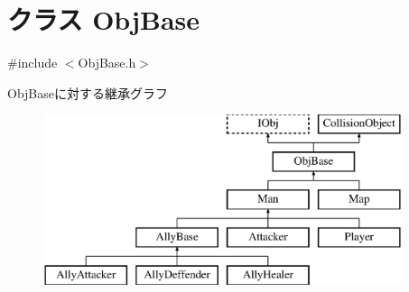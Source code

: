 \hypertarget{class_obj_base}{\section{クラス Obj\-Base}
\label{class_obj_base}
}


{\ttfamily \#include $<$Obj\-Base.\-h$>$}

Obj\-Baseに対する継承グラフ\begin{figure}[H]
\begin{center}
\leavevmode
\includegraphics[height=5.000000cm]{dc/d24/class_obj_base}
\end{center}
\end{figure}
